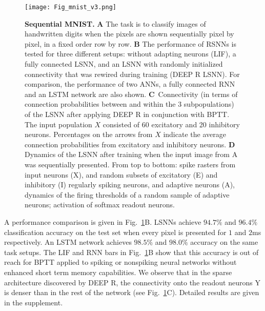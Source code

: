 \documentclass{article} \pdfoutput=1
\begin{document}
\begin{figure}
	\texttt{[image: Fig\_mnist\_v3.png]}
        \caption{\label{fig:mnist} \textbf{Sequential MNIST.}
          \textbf{A} The task is to classify images of
          handwritten digits when the pixels are shown sequentially pixel by pixel, in a fixed order
          row by row.  \textbf{B} The performance of RSNNs is tested for three different setups: without
          adapting neurons (LIF), a fully connected LSNN, and an LSNN with randomly
          initialized connectivity that was rewired during training (DEEP R LSNN).
          For comparison, the performance of two ANNs, a fully connected RNN and an LSTM network are also shown.
          \mbox{\textbf{C} Connectivity} (in terms of connection probabilities between and within the 3 subpopulations) of the LSNN after applying DEEP R in conjunction with BPTT.
          The input population $X$ consisted of 60 excitatory and 20 inhibitory neurons.
          Percentages on the arrows from $X$ indicate the average connection probabilities from excitatory and inhibitory neurons.
          \textbf{D} Dynamics of the LSNN after training when the input image from A was sequentially presented. From top to
          bottom: spike rasters from input neurons (X), and random subsets of excitatory (E) and inhibitory (I) regularly spiking neurons, and
          adaptive neurons (A), dynamics of the firing thresholds of a random sample of adaptive neurons; activation of softmax readout neurons.}
\end{figure}

A performance comparison is given in Fig.~\ref{fig:mnist}B. LSNNs achieve $94.7\%$ and $96.4\%$ classification accuracy on the test set when every pixel is presented for $1$ and $2$ms respectively.
An LSTM network achieves $98.5\%$ and $98.0\%$ accuracy on the same task setups.
The LIF and RNN bars in Fig.~\ref{fig:mnist}B show that this accuracy is out of reach for BPTT applied to spiking or nonspiking neural networks
without enhanced short term memory capabilities.
We observe that in the sparse architecture discovered by DEEP R, the
connectivity onto the readout neurons Y is denser than in the rest of the network (see Fig.~\ref{fig:mnist}C).
Detailed results are given in the supplement.
\end{document}
